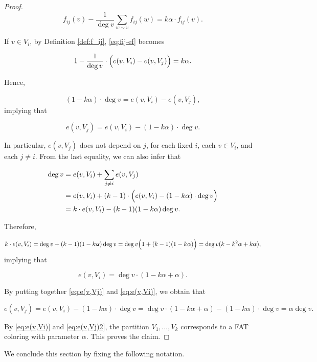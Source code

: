 \documentclass{article}
\theoremstyle{plain}
\theoremstyle{definition}
\theoremstyle{remark}
\begin{document}
\begin{proof}
\begin{equation}\label{eq:fij-ef}
    f_{ij}(v)-\frac{1}{\deg v}\sum_{w\sim v}f_{ij}(w)=k\alpha \cdot f_{ij}(v).
\end{equation}

If $v\in V_i$, by Definition \ref{def:f_ij}, \eqref{eq:fij-ef} becomes

$$
1-\frac{1}{\deg v}\cdot \Bigl(e(v,V_i)-e(v,V_j)\Bigr)=k\alpha.
$$

Hence,

$$
(1-k\alpha)\cdot \deg v = e(v,V_i)-e(v,V_j),
$$ implying that 


\begin{equation}\label{eq:e(v,Vj)}
    e(v,V_j)=e(v,V_i)-(1-k\alpha)\cdot \deg v.
\end{equation}

 In particular, $e(v,V_j)$ does not depend on $j$, for each fixed $i$, each $v\in V_i$, and each $j\neq i$. From the last equality, we can also infer that

\begin{align*}
    \deg v&=e(v,V_i)+\sum_{j\neq i}e(v,V_j)\\ &=e(v,V_i)+(k-1)\cdot \Bigl(e(v,V_i)-(1-k\alpha)\cdot \deg v\Bigr)\\
    &= k\cdot e(v,V_i)-(k-1)(1-k\alpha)\deg v.
\end{align*}

Therefore,

$$
k\cdot e(v,V_i)=\deg v+(k-1)(1-k\alpha)\deg v=\deg v\Bigl(1+(k-1)(1-k\alpha)\Bigr)=\deg v(k-k^2\alpha+k\alpha),
$$ implying that

\begin{equation}\label{eq:e(v,Vi)}
   e(v,V_i)=\deg v\cdot (1-k\alpha+\alpha). 
\end{equation}


By putting together \eqref{eq:e(v,Vj)} and \eqref{eq:e(v,Vi)}, we obtain that

\begin{equation}\label{eq:e(v,Vj)2}
    e(v,V_j)=e(v,V_i)-(1-k\alpha)\cdot \deg v=\deg v\cdot (1-k\alpha+\alpha)-(1-k\alpha)\cdot \deg v=\alpha \deg v.
\end{equation}

By \eqref{eq:e(v,Vi)} and \eqref{eq:e(v,Vj)2}, the partition $V_1,\ldots,V_k$ corresponds to a FAT coloring with parameter $\alpha$. This proves the claim.
    
\end{proof}

We conclude this section by fixing the following notation.
\end{document}
